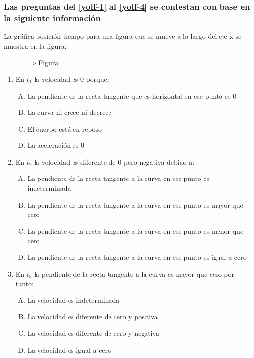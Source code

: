 \subsubsection*{Las preguntas del \ref{yolf-1} al \ref{yolf-4} se contestan con base en la siguiente información}

\noindent La gráfica posición-tiempo para una figura que se mueve a lo largo del eje x se muestra en la figura:


=====> Figura

\begin{enumerate}
\item En $t_1$ la velocidad es 0 porque: \label{yolf-1}\\

\begin{enumerate}[(A)]
\item La pendiente de la recta tangente que es horizontal en ese punto es 0
\item  La curva ni crece ni decrece
\item  El cuerpo está en reposo
\item La aceleración es 0
\end{enumerate}


\item En $t_2$ la velocidad es diferente de 0 pero negativa debido a:  \label{yolf-2}\\

\begin{enumerate}[(A)]
\item La pendiente de la recta tangente a la curva en ese punto es indeterminada
\item La pendiente de la recta tangente a la curva en ese punto es mayor que cero
\item  La pendiente de la recta tangente a la curva en ese punto es menor que cero
\item  La pendiente de la recta tangente a la curva en ese punto es igual a cero
\end{enumerate}

\item En $t_3$ la pendiente de la recta tangente a la curva es mayor que cero por tanto: \label{yolf-3}\\

\begin{enumerate}[(A)]
\item  La velocidad es indeterminada
\item  La velocidad es diferente de cero y positiva
\item La velocidad es diferente de cero y negativa
\item  La velocidad es igual a cero
\end{enumerate}


\end{enumerate}
